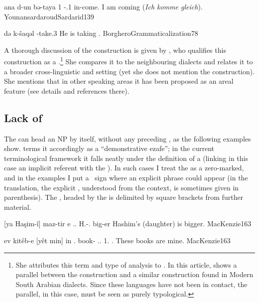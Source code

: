 {ana d-un bə-taya}
{1\sg{} \lnk-\cop.1\sg{} in-come.\inf}
{I am coming (\textit{Ich komme gleich}).}
{YounansardaroudSardarid}{139}

{ də\cb{} k-šaqəl}
{\opt{\cop-3\masc} \lnk\cb{} \ind-take.3\masc}
{He is taking .}
{BorgheroGrammaticalization}{78}

\newpage 
A thorough discussion of the \Ank construction is given by \textcites[77ff]{BorgheroGrammaticalization}{BorgheroContinuous}, who qualifies this construction as a .\footnote{She attributes this term and type of analysis to \citet{Pennacchietti2007}. In this article, \citeauthor{Pennacchietti2007} shows a parallel between the \Kur construction and a similar construction found in Modern South Arabian dialects. Since these languages have not been in contact, the parallel, in this case, must be seen as purely typological.} She compares it to the neighbouring \Kur dialects and relates it to a broader cross-linguistic and  setting (yet she does not mention the \Sar construction). She mentions that in other  speaking areas it has been proposed as an areal feature (see details and references there).

\subsection{Lack of \prim} \label{ss:lnk_zero_prim}

The \Kur \lnk* \ez* can head  an NP by itself, without any preceding \prim, as the following examples show. \citet[162]{MacKenzie} terms it accordingly as a  \enquote{demonstrative ezafe}; in the current terminological framework it falls neatly under the definition of a  (linking in this case an implicit referent with the \secn). In such cases I treat the \prim as a zero-marked, and in the examples I put a \zero\ sign where an explicit \prim phrase could appear (in the translation, the explicit \prim, understood from the context, is sometimes given in parenthesis). The \secn, headed by the \lnk* \ez* is delimited by square brackets from further material.  

{\zero{} [ya Haşim-î] maz-tir \cb{}e}
{\zero{} \lnk.\ez.\fem{} H.-\obl.\masc{} big-er \cb{}\cop}
{Hashim's (daughter) is bigger.}
{MacKenzie}{163}

{ev kitêb-e \zero{} [yêt min] \cb{}in}
{\dem.\near{} book- \zero{} \lnk.\ez.\pl{} 1\sg.\obl{} \cb{}\cop.\pl}
{These books are mine.}
{MacKenzie}{163}


